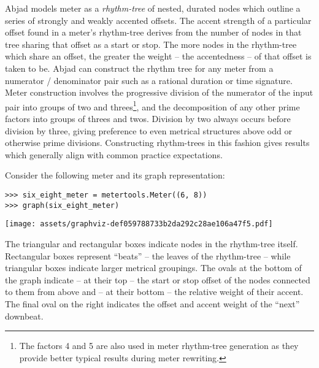 Abjad models meter as a \emph{rhythm-tree} of nested, durated nodes which
outline a series of strongly and weakly accented offsets. The accent strength
of a particular offset found in a meter's rhythm-tree derives from the number
of nodes in that tree sharing that offset as a start or stop. The more nodes in
the rhythm-tree which share an offset, the greater the weight -- the
accentedness -- of that offset is taken to be. Abjad can construct the rhythm
tree for any meter from a numerator / denominator pair such as a rational
duration or time signature. Meter construction involves the progressive
division of the numerator of the input pair into groups of two and
threes\footnote{The factors 4 and 5 are also used in meter rhythm-tree
generation as they provide better typical results during meter rewriting.}, and
the decomposition of any other prime factors into groups of threes and twos.
Division by two always occurs before division by three, giving preference to
even metrical structures above odd or otherwise prime divisions. Constructing
rhythm-trees in this fashion gives results which generally align with common
practice expectations.

Consider the following  meter and its graph representation:

\begin{comment}
<abjad>
six_eight_meter = metertools.Meter((6, 8))
graph(six_eight_meter)
</abjad>
\end{comment}

\begin{abjadbookoutput}
\begin{singlespacing}
\vspace{-0.5\baselineskip}
\begin{verbatim}
>>> six_eight_meter = metertools.Meter((6, 8))
>>> graph(six_eight_meter)
\end{verbatim}
\noindent\texttt{[image: assets/graphviz-def059788733b2da292c28ae106a47f5.pdf]}
\end{singlespacing}
\end{abjadbookoutput}

\noindent The triangular and rectangular boxes indicate nodes in the
rhythm-tree itself. Rectangular boxes represent \enquote{beats} -- the leaves
of the rhythm-tree -- while triangular boxes indicate larger metrical
groupings. The ovals at the bottom of the graph indicate -- at their top -- the
start or stop offset of the nodes connected to them from above and -- at their
bottom -- the relative weight of their accent. The final oval on the right
indicates the offset and accent weight of the \enquote{next} downbeat.

